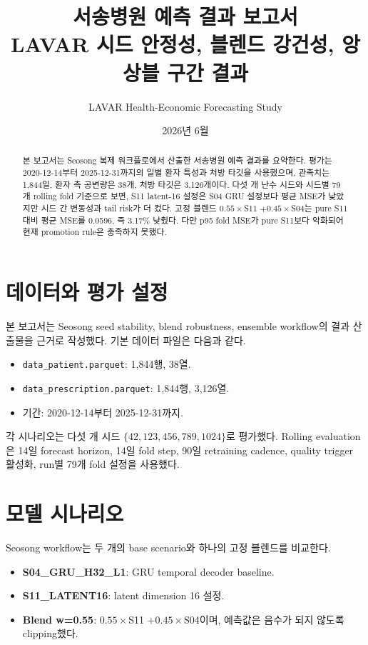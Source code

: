 \documentclass[11pt]{article}
\title{\textbf{서송병원 예측 결과 보고서}\\
\large LAVAR 시드 안정성, 블렌드 강건성, 앙상블 구간 결과}
\author{LAVAR Health-Economic Forecasting Study}
\date{2026년 6월}
\begin{document}
\maketitle

\begin{abstract}
본 보고서는 Seosong 복제 워크플로에서 산출한 서송병원 예측 결과를
요약한다. 평가는 2020-12-14부터 2025-12-31까지의 일별 환자 특성과
처방 타깃을 사용했으며, 관측치는 1,844일, 환자 측 공변량은 38개,
처방 타깃은 3,126개이다. 다섯 개 난수 시드와 시드별 79개 rolling
fold 기준으로 보면, S11 latent-16 설정은 S04 GRU 설정보다 평균 MSE가
낮았지만 시드 간 변동성과 tail risk가 더 컸다. 고정 블렌드
$0.55\times$S11 $+0.45\times$S04는 pure S11 대비 평균 MSE를 0.0596,
즉 3.17\% 낮췄다. 다만 p95 fold MSE가 pure S11보다 악화되어 현재
promotion rule은 충족하지 못했다.
\end{abstract}

\section{데이터와 평가 설정}

본 보고서는 Seosong seed stability, blend robustness, ensemble workflow의
결과 산출물을 근거로 작성했다. 기본 데이터 파일은 다음과 같다.
\begin{itemize}
  \item \texttt{data\_patient.parquet}: 1,844행, 38열.
  \item \texttt{data\_prescription.parquet}: 1,844행, 3,126열.
  \item 기간: 2020-12-14부터 2025-12-31까지.
\end{itemize}

각 시나리오는 다섯 개 시드
$\{42, 123, 456, 789, 1024\}$로 평가했다. Rolling evaluation은
14일 forecast horizon, 14일 fold step, 90일 retraining cadence,
quality trigger 활성화, run별 79개 fold 설정을 사용했다.

\section{모델 시나리오}

Seosong workflow는 두 개의 base scenario와 하나의 고정 블렌드를 비교한다.
\begin{itemize}
  \item \textbf{S04\_GRU\_H32\_L1}: GRU temporal decoder baseline.
  \item \textbf{S11\_LATENT16}: latent dimension 16 설정.
  \item \textbf{Blend w=0.55}: $0.55\times$S11 $+0.45\times$S04이며,
  예측값은 음수가 되지 않도록 clipping했다.
\end{itemize}
\end{document}
